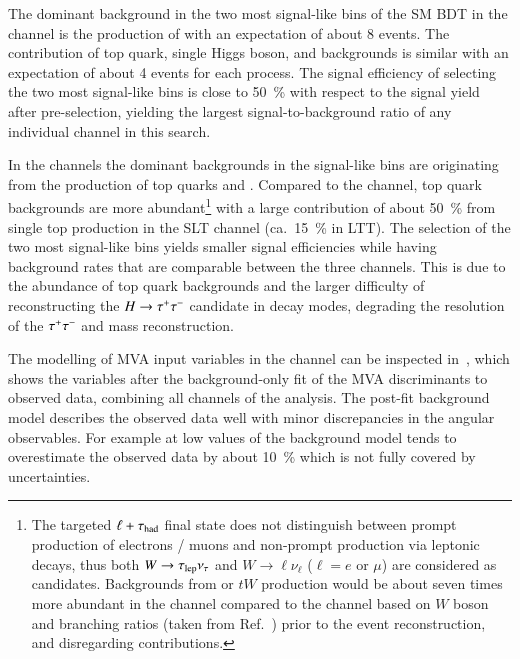 The dominant background in the two most signal-like bins of the SM \HH
BDT in the \hadhad channel is the production of \ZHF with an
expectation of about 8 events. The contribution of top quark, single
Higgs boson, and \faketauhadvis backgrounds is similar with an
expectation of about 4 events for each process. The signal efficiency
of selecting the two most signal-like bins is close to
\SI{50}{\percent} with respect to the signal yield after
pre-selection, yielding the largest signal-to-background ratio of any
individual channel in this search.

In the \lephad channels the dominant backgrounds in the signal-like
bins are originating from the production of top quarks and
\ZHF. Compared to the \hadhad channel, top quark backgrounds are more
abundant\footnote{The targeted $\ell + \tau_{\text{had}}$ final state does not
  distinguish between prompt production of electrons / muons and
  non-prompt production via leptonic \taulepton decays, thus both
  $W \to \tau_{\text{lep}} \nu_{\tau}$ and $W \to \ell \nu_{\ell}$ ($\ell = e$
  or $\mu$) are considered as \taulepvis candidates. Backgrounds from
  \ttbar or $tW$ production would be about seven times more abundant
  in the \lephad channel compared to the \hadhad channel based on $W$
  boson and \taulepton branching ratios (taken from
  Ref.~\cite{pdg2020}) prior to the event reconstruction, and
  disregarding \faketauhadvis contributions.}  with a large
contribution of about \SI{50}{\percent} from single top production in
the SLT channel (ca.\ \SI{15}{\percent} in LTT). The selection of the
two most signal-like bins yields smaller signal efficiencies while
having background rates that are comparable between the three
channels. This is due to the abundance of top quark backgrounds and
the larger difficulty of reconstructing the $H \to \tau^{+} \tau^{-}$ candidate
in \lephad decay modes, degrading the resolution of the $\tau^{+} \tau^{-}$ and
\HH mass reconstruction.

The modelling of MVA input variables in the \hadhad channel can be
inspected in~, which shows the variables
after the background-only fit of the MVA discriminants to observed
data, combining all channels of the analysis. The post-fit background
model describes the observed data well with minor discrepancies in the
angular observables. For example at low values of \dRtautau the
background model tends to overestimate the observed data by about
\SI{10}{\percent} which is not fully covered by uncertainties.

